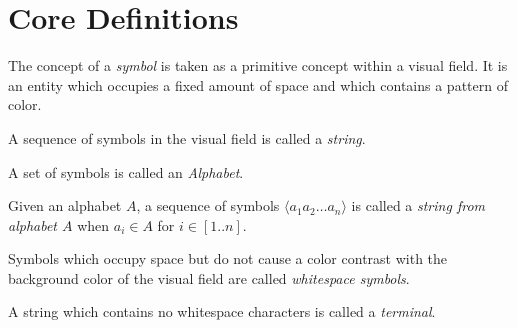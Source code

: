 \documentclass{article}
\newcommand{\nl}{\bigskip\noindent}
\newcommand{\seq}[1]{\langle #1\rangle}
\newcommand{\defcon}[1]{\emph{#1}}
\begin{document}
\section{Core Definitions}

\nl The concept of a \defcon{symbol} is taken as a primitive concept within a visual field.  It is an entity which occupies a fixed amount of space and which contains a pattern of color.  

\nl A sequence of symbols in the visual field is called a \defcon{string}.

\nl A set of symbols is called an \defcon{Alphabet}.

\nl Given an alphabet $A$, a sequence of symbols $\seq{a_1a_2\dots a_n}$  is called a \defcon{string from alphabet $A$}  when  $a_i\in A$ for $i\in[1..n]$.

\nl Symbols which occupy space but do not cause a color contrast with the background color of the visual field are called \defcon{whitespace symbols}.

\nl A string which contains no whitespace characters is called a \defcon{terminal}.

 
\end{document}
